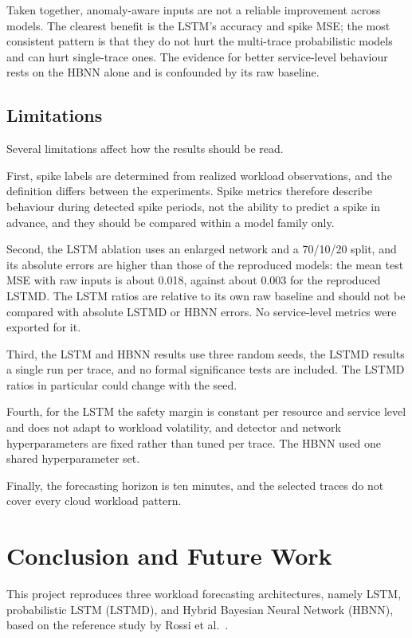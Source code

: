 \documentclass[conference]{IEEEtran}
\begin{document}
Taken together, anomaly-aware inputs are not a reliable improvement across models. The clearest benefit is the LSTM's accuracy and spike MSE; the most consistent pattern is that they do not hurt the multi-trace probabilistic models and can hurt single-trace ones. The evidence for better service-level behaviour rests on the HBNN alone and is confounded by its raw baseline.

\subsection{Limitations}

Several limitations affect how the results should be read.

First, spike labels are determined from realized workload observations, and the definition differs between the experiments. Spike metrics therefore describe behaviour during detected spike periods, not the ability to predict a spike in advance, and they should be compared within a model family only.

Second, the LSTM ablation uses an enlarged network and a 70/10/20 split, and its absolute errors are higher than those of the reproduced models: the mean test MSE with raw inputs is about 0.018, against about 0.003 for the reproduced LSTMD. The LSTM ratios are relative to its own raw baseline and should not be compared with absolute LSTMD or HBNN errors. No service-level metrics were exported for it.

Third, the LSTM and HBNN results use three random seeds, the LSTMD results a single run per trace, and no formal significance tests are included. The LSTMD ratios in particular could change with the seed.

Fourth, for the LSTM the safety margin is constant per resource and service level and does not adapt to workload volatility, and detector and network hyperparameters are fixed rather than tuned per trace. The HBNN used one shared hyperparameter set.

Finally, the forecasting horizon is ten minutes, and the selected traces do not cover every cloud workload pattern.

\section{Conclusion and Future Work}

This project reproduces three workload forecasting architectures, namely LSTM, probabilistic LSTM (LSTMD), and Hybrid Bayesian Neural Network (HBNN), based on the reference study by Rossi et al.~\cite{rossi2025}.
\end{document}
